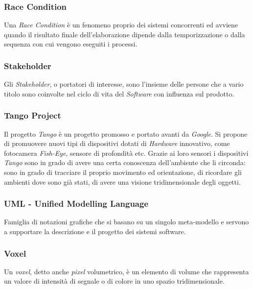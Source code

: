 \subsubsection{Race Condition}
Una \emph{Race Condition} è un fenomeno proprio dei sistemi concorrenti ed avviene quando il risultato finale dell'elaborazione dipende dalla temporizzazione o dalla sequenza con cui vengono eseguiti i processi. 

\subsubsection{Stakeholder}
Gli \emph{Stakeholder}, o portatori di interesse, sono l'insieme delle persone che a vario titolo sono coinvolte nel ciclo di vita del \emph{Software} con influenza sul prodotto.

\subsubsection{Tango Project}
Il progetto \emph{Tango} è un progetto promosso e portato avanti da \emph{Google}. Si propone di promuovere nuovi tipi di dispositivi dotati di \emph{Hardware} innovativo, come fotocamera \emph{Fish-Eye}, sensore di profondità etc. Grazie ai loro sensori i dispositivi \emph{Tango} sono in grado di avere una certa conoscenza dell'ambiente che li circonda: sono in grado di tracciare il proprio movimento ed orientazione, di ricordare gli ambienti dove sono già stati, di avere una visione tridimensionale degli oggetti.

\subsubsection{UML - Unified Modelling Language}
Famiglia di notazioni grafiche che si basano su un singolo meta-modello e servono a
supportare la descrizione e il progetto dei sistemi software.

\subsubsection{Voxel}
Un \emph{voxel}, detto anche \emph{pixel} volumetrico, è un elemento di volume che rappresenta un valore di intensità di segnale o di colore in uno spazio tridimensionale.






